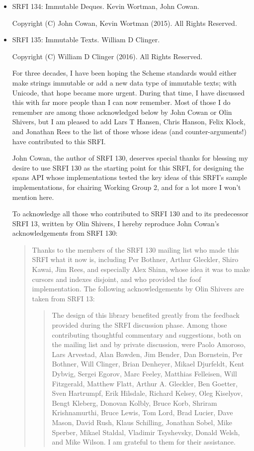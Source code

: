 \begin{itemize}
\item SRFI 134: Immutable Deques. Kevin Wortman, John Cowan.

Copyright (C) John Cowan, Kevin Wortman (2015). All Rights Reserved.

\item SRFI 135: Immutable Texts. William D Clinger.

Copyright (C) William D Clinger (2016). All Rights Reserved.

For three decades, I have been hoping the Scheme standards would either
make strings immutable or add a new data type of immutable texts; with
Unicode, that hope became more urgent. During that time, I have
discussed this with far more people than I can now remember. Most of
those I do remember are among those acknowledged below by John Cowan or
Olin Shivers, but I am pleased to add Lars T Hansen, Chris Hanson, Felix
Klock, and Jonathan Rees to the list of those whose ideas (and
counter-arguments!) have contributed to this SRFI.

John Cowan, the author of SRFI 130, deserves special thanks for blessing
my desire to use SRFI 130 as the starting point for this SRFI, for
designing the spans API whose implementations tested the key ideas of
this SRFI's sample implementations, for chairing Working Group 2, and
for a lot more I won't mention here.

To acknowledge all those who contributed to SRFI 130 and to its
predecessor SRFI 13, written by Olin Shivers, I hereby reproduce John
Cowan's acknowledgements from SRFI 130:

\begin{quote}
Thanks to the members of the SRFI 130 mailing list who made this SRFI
what it now is, including Per Bothner, Arthur Gleckler, Shiro Kawai, Jim
Rees, and especially Alex Shinn, whose idea it was to make cursors and
indexes disjoint, and who provided the foof implementation. The
following acknowledgements by Olin Shivers are taken from SRFI 13:

\begin{quote}
The design of this library benefited greatly from the feedback provided
during the SRFI discussion phase. Among those contributing thoughtful
commentary and suggestions, both on the mailing list and by private
discussion, were Paolo Amoroso, Lars Arvestad, Alan Bawden, Jim Bender,
Dan Bornstein, Per Bothner, Will Clinger, Brian Denheyer, Mikael
Djurfeldt, Kent Dybvig, Sergei Egorov, Marc Feeley, Matthias Felleisen,
Will Fitzgerald, Matthew Flatt, Arthur A. Gleckler, Ben Goetter, Sven
Hartrumpf, Erik Hilsdale, Richard Kelsey, Oleg Kiselyov, Bengt Kleberg,
Donovan Kolbly, Bruce Korb, Shriram Krishnamurthi, Bruce Lewis, Tom
Lord, Brad Lucier, Dave Mason, David Rush, Klaus Schilling, Jonathan
Sobel, Mike Sperber, Mikael Staldal, Vladimir Tsyshevsky, Donald Welsh,
and Mike Wilson. I am grateful to them for their assistance.


\end{quote}
\end{quote}
\end{itemize}
